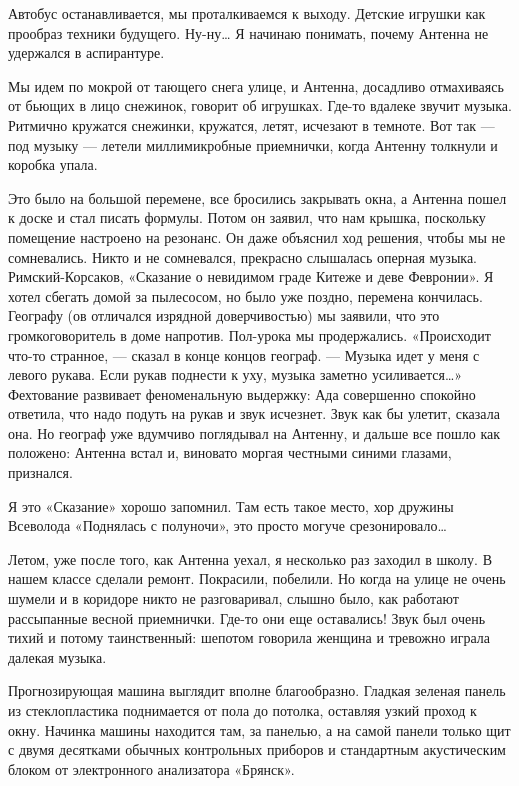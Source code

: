    Автобус останавливается, мы проталкиваемся  к выходу. Детские игрушки  как
   прообраз техники будущего.  Ну-ну… Я начинаю  понимать, почему Антенна  не
   удержался в аспирантуре.

   Мы идем по мокрой от тающего снега улице, и Антенна, досадливо отмахиваясь
   от бьющих  в лицо  снежинок, говорит  об игрушках.  Где-то вдалеке  звучит
   музыка. Ритмично кружатся снежинки,  кружатся, летят, исчезают в  темноте.
   Вот так —  под музыку  — летели миллимикробные  приемнички, когда  Антенну
   толкнули и коробка упала.

   Это было  на большой  перемене, все  бросились закрывать  окна, а  Антенна
   пошел к доске  и стал  писать формулы. Потом  он заявил,  что нам  крышка,
   поскольку помещение настроено на резонанс.  Он даже объяснил ход  решения,
   чтобы мы  не  сомневались.  Никто и  не  сомневался,  прекрасно  слышалась
   оперная музыка.  Римский-Корсаков, «Сказание  о невидимом  граде Китеже  и
   деве Февронии». Я хотел  сбегать домой за пылесосом,  но было уже  поздно,
   перемена кончилась.  Географу  (ов отличался  изрядной  доверчивостью)  мы
   заявили,  что  это   громкоговоритель  в  доме   напротив.  Пол-урока   мы
   продержались.  «Происходит  что-то  странное,  —  сказал  в  конце  концов
   географ. — Музыка идет у меня с левого рукава. Если рукав поднести к  уху,
   музыка заметно усиливается…» Фехтование развивает феноменальную  выдержку:
   Ада совершенно  спокойно  ответила,  что  надо  подуть  на  рукав  и  звук
   исчезнет. Звук  как  бы  улетит,  сказала она.  Но  географ  уже  вдумчиво
   поглядывал на Антенну, и дальше все  пошло как положено: Антенна встал  и,
   виновато моргая честными синими глазами, признался.

   Я это  «Сказание»  хорошо запомнил.  Там  есть такое  место,  хор  дружины
   Всеволода «Поднялась с полуночи», это просто могуче срезонировало…

   Летом, уже после того, как Антенна уехал, я несколько раз заходил в школу.
   В нашем классе сделали ремонт. Покрасили,  побелили. Но когда на улице  не
   очень шумели и в коридоре никто не разговаривал, слышно было, как работают
   рассыпанные весной приемнички. Где-то они  еще оставались! Звук был  очень
   тихий и потому  таинственный: шепотом говорила  женщина и тревожно  играла
   далекая музыка.

   Прогнозирующая машина выглядит вполне благообразно. Гладкая зеленая панель
   из стеклопластика поднимается от пола до потолка, оставляя узкий проход  к
   окну. Начинка машины находится там, за  панелью, а на самой панели  только
   щит  с  двумя  десятками   обычных  контрольных  приборов  и   стандартным
   акустическим блоком от электронного анализатора «Брянск».

